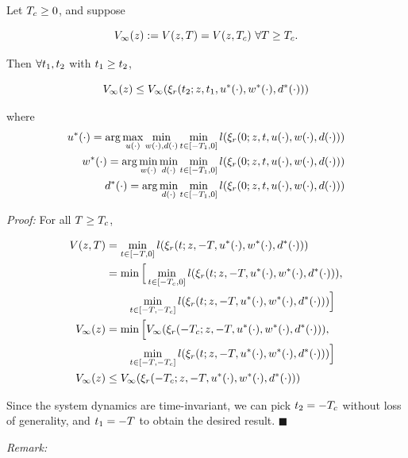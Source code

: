  \begin{thm}
   Let $T_c \ge 0$, and suppose
   
   \begin{equation}
   \label{eq:conv_valfunc}
   V_\infty(z) := V(z, T) = V(z, T_c) ~ \forall T \ge T_c.
   \end{equation}
   
   Then $\forall t_1, t_2$ with $t_1 \ge t_2$,
   
   \begin{equation}
   V_\infty(z) \le V_\infty(\xi_r(t_2; z, t_1, u^*(\cdot), w^*(\cdot), d^*(\cdot))) 
   \end{equation}
   
   \noindent where
   \begin{equation}
   \begin{aligned}
   u^*(\cdot) = \arg \max_{u(\cdot)} \min_{w(\cdot), d(\cdot)} \min_{t \in [-T_1, 0]} l(\xi_r(0; z, t, u(\cdot), w(\cdot), d(\cdot))) \\
   w^*(\cdot) = \arg \min_{w(\cdot)} \min_{d(\cdot)} \min_{t \in [-T_1, 0]} l(\xi_r(0; z, t, u(\cdot), w(\cdot), d(\cdot))) \\
   d^*(\cdot) = \arg \min_{d(\cdot)} \min_{t \in [-T_1, 0]} l(\xi_r(0; z, t, u(\cdot), w(\cdot), d(\cdot))) 
   \end{aligned}
   \end{equation}
   
 \end{thm}
 
\textit{Proof:} For all $T \ge T_c$,
   
   \begin{equation}
   \begin{aligned}
   V(z, T) &= \min_{t \in [-T, 0]} l(\xi_r(t; z, -T, u^*(\cdot), w^*(\cdot), d^*(\cdot))) \\
   &= \min \Big[ \min_{t \in [-T_c, 0]} l(\xi_r(t; z, -T, u^*(\cdot), w^*(\cdot), d^*(\cdot))), \\
   &\qquad\min_{t \in [-T, -T_c]} l(\xi_r(t; z, -T, u^*(\cdot), w^*(\cdot), d^*(\cdot))) \Big] \\
   V_\infty(z) &= \min \Big[ V_\infty(\xi_r(-T_c; z, -T, u^*(\cdot), w^*(\cdot), d^*(\cdot))), \\
   &\qquad\min_{t \in [-T, -T_c]} l(\xi_r(t; z, -T, u^*(\cdot), w^*(\cdot), d^*(\cdot))) \Big] \\
   V_\infty(z) &\le V_\infty(\xi_r(-T_c; z, -T, u^*(\cdot), w^*(\cdot), d^*(\cdot))) \\
   \end{aligned}
   \end{equation}
   
   Since the system dynamics are time-invariant, we can pick $t_2 = -T_c$ without loss of generality, and $t_1 = -T$ to obtain the desired result. \hfill $\blacksquare$
 
 \textit{Remark:} 
